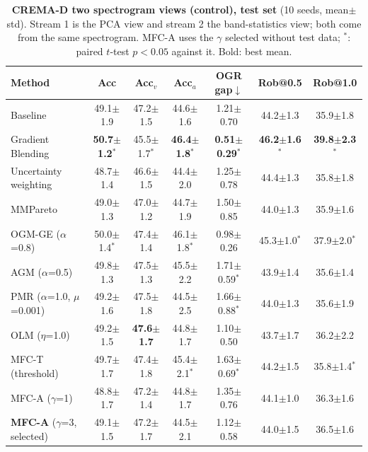 \documentclass[fleqn,10pt]{wlscirep}
\newcommand{\pmm}{$\pm$}
\begin{document}
\begin{table}[t]
\caption{\textbf{CREMA-D two spectrogram views (control), test set} (10 seeds, mean\pmm std). Stream 1 is the PCA view and stream 2 the band-statistics view; both come from the same spectrogram. MFC-A uses the $\gamma$ selected without test data; $^{*}$: paired $t$-test $p<0.05$ against it. Bold: best mean.}
\label{tab:main_spec}
\centering
\footnotesize
\begin{tabular}{@{}lcccccc@{}}
\toprule
\textbf{Method} & \textbf{Acc} & \textbf{Acc$_v$} & \textbf{Acc$_a$} & \textbf{OGR gap}$\downarrow$ & \textbf{Rob@0.5} & \textbf{Rob@1.0} \\ \midrule
Baseline & 49.1$\pm$1.9 & 47.2$\pm$1.5 & 44.6$\pm$1.6 & 1.21$\pm$0.70 & 44.2$\pm$1.3 & 35.9$\pm$1.8 \\
Gradient Blending & \textbf{50.7$\pm$1.2$^{*}$} & 45.5$\pm$1.7$^{*}$ & \textbf{46.4$\pm$1.8$^{*}$} & \textbf{0.51$\pm$0.29$^{*}$} & \textbf{46.2$\pm$1.6$^{*}$} & \textbf{39.8$\pm$2.3$^{*}$} \\
Uncertainty weighting & 48.7$\pm$1.4 & 46.6$\pm$1.5 & 44.4$\pm$2.0 & 1.25$\pm$0.78 & 44.4$\pm$1.3 & 35.8$\pm$1.8 \\
MMPareto & 49.0$\pm$1.3 & 47.0$\pm$1.2 & 44.7$\pm$1.9 & 1.50$\pm$0.85 & 44.0$\pm$1.3 & 35.9$\pm$1.6 \\
OGM-GE ($\alpha$=0.8) & 50.0$\pm$1.4$^{*}$ & 47.4$\pm$1.4 & 46.1$\pm$1.8$^{*}$ & 0.98$\pm$0.26 & 45.3$\pm$1.0$^{*}$ & 37.9$\pm$2.0$^{*}$ \\
AGM ($\alpha$=0.5) & 49.8$\pm$1.3 & 47.5$\pm$1.3 & 45.5$\pm$2.2 & 1.71$\pm$0.59$^{*}$ & 43.9$\pm$1.4 & 35.6$\pm$1.4 \\
PMR ($\alpha$=1.0, $\mu$=0.001) & 49.2$\pm$1.6 & 47.5$\pm$1.8 & 44.5$\pm$2.5 & 1.66$\pm$0.88$^{*}$ & 44.0$\pm$1.3 & 35.6$\pm$1.9 \\
OLM ($\eta$=1.0) & 49.2$\pm$1.5 & \textbf{47.6$\pm$1.7} & 44.8$\pm$1.7 & 1.10$\pm$0.50 & 43.7$\pm$1.7 & 36.2$\pm$2.2 \\
MFC-T (threshold) & 49.7$\pm$1.7 & 47.4$\pm$1.8 & 45.4$\pm$2.1$^{*}$ & 1.63$\pm$0.69$^{*}$ & 44.2$\pm$1.5 & 35.8$\pm$1.4$^{*}$ \\
MFC-A ($\gamma$=1) & 48.8$\pm$1.7 & 47.2$\pm$1.4 & 44.8$\pm$1.7 & 1.35$\pm$0.76 & 44.1$\pm$1.0 & 36.3$\pm$1.6 \\
\textbf{MFC-A} ($\gamma$=3, selected) & 49.1$\pm$1.5 & 47.2$\pm$1.7 & 44.5$\pm$2.1 & 1.12$\pm$0.58 & 44.0$\pm$1.5 & 36.5$\pm$1.6 \\
\bottomrule
\end{tabular}
\end{table}
\end{document}
